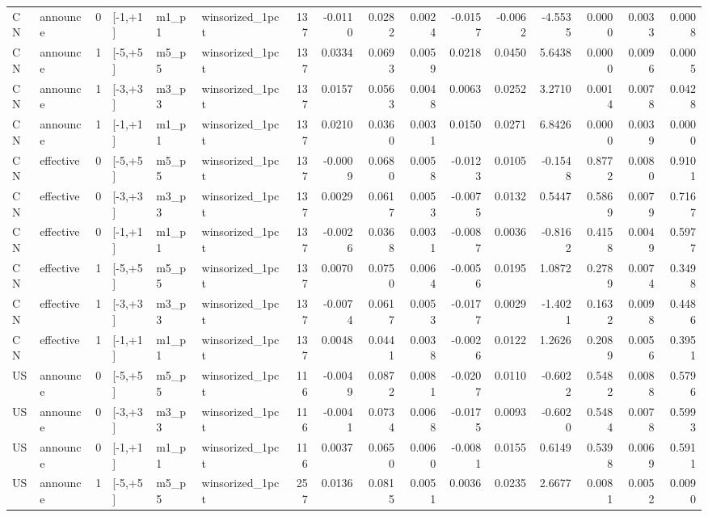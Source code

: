 \begin{tabular}{llrlllrrrrrrrrrr}
CN & announce & 0 & [-1,+1] & m1_p1 & winsorized_1pct & 137 & -0.0110 & 0.0282 & 0.0024 & -0.0157 & -0.0062 & -4.5535 & 0.0000 & 0.0033 & 0.0008 \\
CN & announce & 1 & [-5,+5] & m5_p5 & winsorized_1pct & 137 & 0.0334 & 0.0693 & 0.0059 & 0.0218 & 0.0450 & 5.6438 & 0.0000 & 0.0096 & 0.0005 \\
CN & announce & 1 & [-3,+3] & m3_p3 & winsorized_1pct & 137 & 0.0157 & 0.0563 & 0.0048 & 0.0063 & 0.0252 & 3.2710 & 0.0014 & 0.0078 & 0.0428 \\
CN & announce & 1 & [-1,+1] & m1_p1 & winsorized_1pct & 137 & 0.0210 & 0.0360 & 0.0031 & 0.0150 & 0.0271 & 6.8426 & 0.0000 & 0.0039 & 0.0000 \\
CN & effective & 0 & [-5,+5] & m5_p5 & winsorized_1pct & 137 & -0.0009 & 0.0680 & 0.0058 & -0.0123 & 0.0105 & -0.1548 & 0.8772 & 0.0080 & 0.9101 \\
CN & effective & 0 & [-3,+3] & m3_p3 & winsorized_1pct & 137 & 0.0029 & 0.0617 & 0.0053 & -0.0075 & 0.0132 & 0.5447 & 0.5869 & 0.0079 & 0.7167 \\
CN & effective & 0 & [-1,+1] & m1_p1 & winsorized_1pct & 137 & -0.0026 & 0.0368 & 0.0031 & -0.0087 & 0.0036 & -0.8162 & 0.4158 & 0.0049 & 0.5977 \\
CN & effective & 1 & [-5,+5] & m5_p5 & winsorized_1pct & 137 & 0.0070 & 0.0750 & 0.0064 & -0.0056 & 0.0195 & 1.0872 & 0.2789 & 0.0074 & 0.3498 \\
CN & effective & 1 & [-3,+3] & m3_p3 & winsorized_1pct & 137 & -0.0074 & 0.0617 & 0.0053 & -0.0177 & 0.0029 & -1.4021 & 0.1632 & 0.0098 & 0.4486 \\
CN & effective & 1 & [-1,+1] & m1_p1 & winsorized_1pct & 137 & 0.0048 & 0.0441 & 0.0038 & -0.0026 & 0.0122 & 1.2626 & 0.2089 & 0.0056 & 0.3951 \\
US & announce & 0 & [-5,+5] & m5_p5 & winsorized_1pct & 116 & -0.0049 & 0.0872 & 0.0081 & -0.0207 & 0.0110 & -0.6022 & 0.5482 & 0.0088 & 0.5796 \\
US & announce & 0 & [-3,+3] & m3_p3 & winsorized_1pct & 116 & -0.0041 & 0.0734 & 0.0068 & -0.0175 & 0.0093 & -0.6020 & 0.5484 & 0.0078 & 0.5993 \\
US & announce & 0 & [-1,+1] & m1_p1 & winsorized_1pct & 116 & 0.0037 & 0.0650 & 0.0060 & -0.0081 & 0.0155 & 0.6149 & 0.5398 & 0.0069 & 0.5911 \\
US & announce & 1 & [-5,+5] & m5_p5 & winsorized_1pct & 257 & 0.0136 & 0.0815 & 0.0051 & 0.0036 & 0.0235 & 2.6677 & 0.0081 & 0.0052 & 0.0090 \\

\end{tabular}
